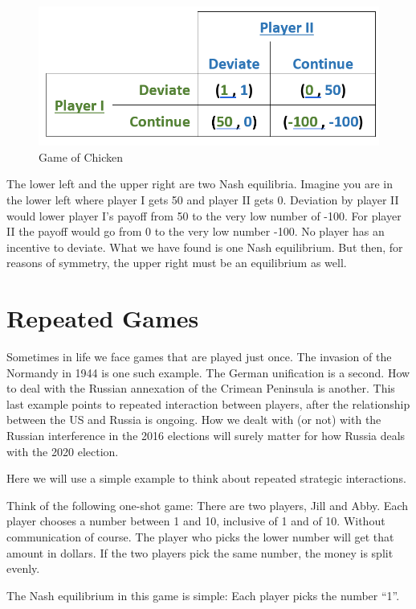 \documentclass[
]{book}
\begin{document}
\begin{figure}

{\centering \includegraphics[width=0.5\linewidth]{img/gametheory/fig3} 

}

\caption{Game of Chicken}\label{fig:gametheory03}
\end{figure}

The lower left and the upper right are two Nash equilibria. Imagine you are in the lower left where player I gets 50 and player II gets 0. Deviation by player II would lower player I's payoff from 50 to the very low number of -100. For player II the payoff would go from 0 to the very low number -100. No player has an incentive to deviate. What we have found is one Nash equilibrium. But then, for reasons of symmetry, the upper right must be an equilibrium as well.

\hypertarget{repeated-games}{%
\section{Repeated Games}\label{repeated-games}}

Sometimes in life we face games that are played just once. The invasion of the Normandy in 1944 is one such example. The German unification is a second. How to deal with the Russian annexation of the Crimean Peninsula is another. This last example points to repeated interaction between players, after the relationship between the US and Russia is ongoing. How we dealt with (or not) with the Russian interference in the 2016 elections will surely matter for how Russia deals with the 2020 election.

Here we will use a simple example to think about repeated strategic interactions.

Think of the following one-shot game: There are two players, Jill and Abby. Each player chooses a number between 1 and 10, inclusive of 1 and of 10. Without communication of course. The player who picks the lower number will get that amount in dollars. If the two players pick the same number, the money is split evenly.

The Nash equilibrium in this game is simple: Each player picks the number ``1''.
\end{document}
